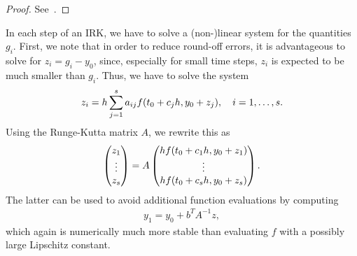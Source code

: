 \begin{proof}
  See~\cite[Theorem 13.13]{HairerWanner10}.
\end{proof}

\begin{remark}
  In each step of an IRK, we have to solve a (non-)linear system for
  the quantities $g_i$. First, we note that in order to reduce
  round-off errors, it is advantageous to solve for $z_i = g_i-y_0$,
  since, especially for small time steps, $z_i$ is expected to be much
  smaller than $g_i$. Thus, we have to solve the system
  \begin{gather}
    \label{eq:implicit:21}
    z_i = h \sum_{j=1}^{s} a_{ij} f(t_0+c_jh, y_0+z_j),
    \quad
    i=1,\dots,s.
  \end{gather}
  Using the Runge-Kutta matrix $A$, we rewrite this as
  \begin{gather}
    \label{eq:implicit:22}
    \begin{pmatrix}
      z_1\\\vdots\\z_s
    \end{pmatrix}
    = A
    \begin{pmatrix}
      hf(t_0+c_1h, y_0+z_1)
      \\\vdots\\
      hf(t_0+c_s h, y_0+z_s)
    \end{pmatrix}.
  \end{gather}
  The latter can be used to avoid additional function evaluations by
  computing
  \begin{gather}
    \label{eq:implicit:23}
    y_1 = y_0 + b^TA^{-1}z, 
  \end{gather}
  which again is numerically much more stable than evaluating $f$ with
  a possibly large Lipschitz constant.
\end{remark}



